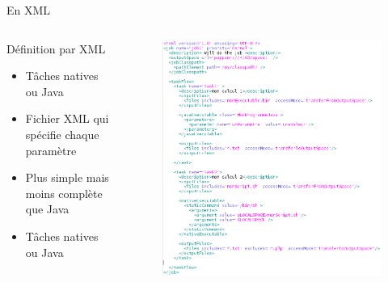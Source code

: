 \documentclass{beamer}
\begin{document}
\begin{frame}{En XML}
	\begin{columns}
	\begin{column}[l]{0.4\linewidth}
        \begin{exampleblock}{Définition par XML}
            \begin{itemize}
                \item T\^aches natives ou Java
                \item Fichier XML qui spécifie chaque paramètre
                \item Plus simple mais moins complète que Java
                \item T\^aches natives ou Java
            \end{itemize}
        \end{exampleblock}
	\end{column}
	\begin{column}[r]{0.6\linewidth}
        \vspace{-1cm}
        \begin{figure}
            \centering
            \includegraphics[scale=0.27]{jobxml.png}
        \end{figure}
	\end{column}
	\end{columns}
    
\end{frame}
\end{document}
